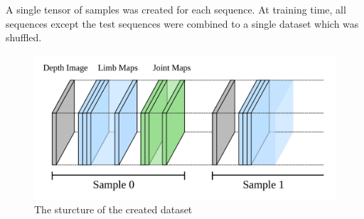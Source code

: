 A single tensor of samples was created for each sequence. At training time, all sequences except the test sequences were combined to a single dataset which was shuffled.

\begin{figure}
  \centering
  \includegraphics[width=.8\textwidth]{img/targets}
  \caption[Data Tensors]{The sturcture of the created dataset}
  \label{fig:targets}
\end{figure}

